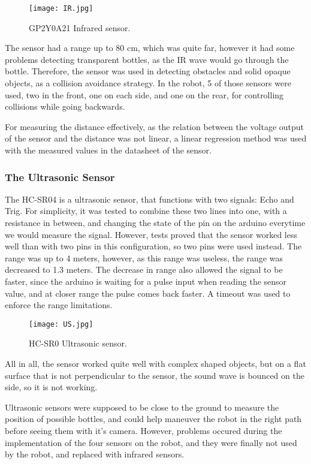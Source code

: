 \begin{figure}[H]
  \centering
  \texttt{[image: IR.jpg]}
  \caption{GP2Y0A21 Infrared sensor.}
\label{fig:IR}
\end{figure}

The sensor had a range up to 80 cm, which was quite far, however it had some problems detecting transparent bottles, as the IR wave would go through the bottle. Therefore, the sensor was used in detecting obstacles and solid opaque objects, as a collision avoidance strategy. In the robot, 5 of those sensors were used, two in the front, one on each side, and one on the rear, for controlling collisions while going backwards.

For measuring the distance effectively, as the relation between the voltage output of the sensor and the distance was not linear, a linear regression method was used with the measured values in the datasheet of the sensor.

\subsubsection{The Ultrasonic Sensor}

The HC-SR04 is a ultrasonic sensor, that functions with two signals: Echo and Trig. For simplicity, it was tested to combine these two lines into one, with a resistance in between, and changing the state of the pin on the arduino everytime we would measure the signal. However, tests proved that the sensor worked less well than with two pins in this configuration, so two pins were used instead. The range was up to 4 meters, however, as this range was useless, the range was decreased to 1.3 meters. The decrease in range also allowed the signal to be faster, since the arduino is waiting for a pulse input when reading the sensor value, and at closer range the pulse comes back faster. A timeout was used to enforce the range limitations. 

\begin{figure}[H]
  \centering
  \texttt{[image: US.jpg]}
  \caption{HC-SR0 Ultrasonic sensor.}
\label{fig:US}
\end{figure}

All in all, the sensor worked quite well with complex shaped objects, but on a flat surface that is not perpendicular to the sensor, the sound wave is bounced on the side, so it is not working.

Ultrasonic sensors were supposed to be close to the ground to measure the position of possible bottles, and could help maneuver the robot in the right path before seeing them with it's camera. However, problems occured during the implementation of the four sensors on the robot, and they were finally not used by the robot, and replaced with infrared sensors.

